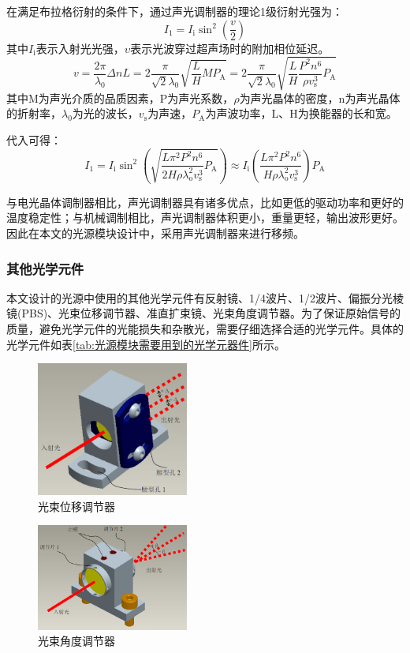 \documentclass[type=master,oneside]{fduthesis}
\begin{document}
在满足布拉格衍射的条件下，通过声光调制器的理论1级衍射光强为：
\begin{equation}
  I_{1}=I_{\mathrm{i}} \sin ^{2}\left(\frac{v}{2}\right)
\end{equation}
其中$I_{\mathrm{i}}$表示入射光光强，$\upsilon $表示光波穿过超声场时的附加相位延迟。
\begin{equation}
  v=\frac{2 \pi}{\lambda_{0}} \Delta n L=2 \frac{\pi}{\sqrt{2} \lambda_{0}} \sqrt{\frac{L}{H} M P_{\mathrm{A}}} =2 \frac{\pi}{\sqrt{2} \lambda_{0}} \sqrt{\frac{L}{H} \frac{P^{2} n^{6}}{\rho v_{\mathrm{s}}^{3}} P_{\mathrm{A}}}
\end{equation}
其中M为声光介质的品质因素，P为声光系数，$\rho $为声光晶体的密度，n为声光晶体的折射率，$ \lambda_{0}$为光的波长，$v_{\mathrm{s}}$为声速，$P_{\mathrm{A}}$为声波功率，L、H为换能器的长和宽。

代入可得：
\begin{equation}
  I_{1}=I_{\mathrm{i}} \sin ^{2}\left(\sqrt{\frac{L \pi^{2} P^{2} n^{6}}{2 H \rho \lambda_{\mathrm{o}}^{2} v_{\mathrm{s}}^{3}} P_{\mathrm{A}}}\right) \approx I_{\mathrm{i}}\left(\frac{L \pi^{2} P^{2} n^{6}}{H \rho \lambda_{\mathrm{o}}^{2} v_{\mathrm{s}}^{3}}\right) P_{\mathrm{A}}
\end{equation}

与电光晶体调制器相比，声光调制器具有诸多优点，比如更低的驱动功率和更好的温度稳定性；与机械调制相比，声光调制器体积更小，重量更轻，输出波形更好。因此在本文的光源模块设计中，采用声光调制器来进行移频。

\subsubsection{其他光学元件}
本文设计的光源中使用的其他光学元件有反射镜、1/4波片、1/2波片、偏振分光棱镜(PBS)、光束位移调节器、准直扩束镜、光束角度调节器。为了保证原始信号的质量，避免光学元件的光能损失和杂散光，需要仔细选择合适的光学元件。具体的光学元件如表\ref{tab:光源模块需要用到的光学元器件}所示。
\begin{figure}[htb]
  \centering
  \includegraphics[width=5cm]{3-fig//光束位移调节器.png}
  \caption{光束位移调节器}
  \label{fig:光束位移调节器}
\end{figure}
\begin{figure}[htb]
  \centering
  \includegraphics[width=5cm]{3-fig//光束角度调节器.png}
  \caption{光束角度调节器}
  \label{fig:光束角度调节器}
\end{figure}
\end{document}
